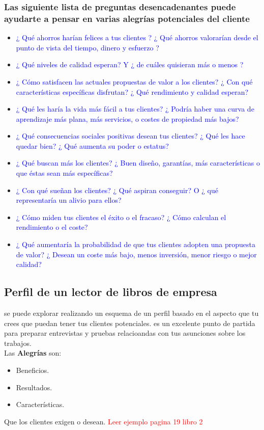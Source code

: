 \documentclass[11pt]{book}
\begin{document}
\subsubsection{Las siguiente lista de preguntas desencadenantes puede ayudarte a pensar en varias alegrías potenciales del cliente}
\begin{itemize}
\item \textcolor{blue}{ ¿ Qué ahorros harían felices a tus clientes ? ¿ Qué ahorros valorarían
desde el punto de vista del tiempo, dinero y esfuerzo ? }
\item \textcolor{blue}{ ¿ Qué niveles de calidad esperan? Y ¿ de cuáles quisieran más o menos ?}
\item \textcolor{blue}{ ¿ Cómo satisfacen las actuales propuestas de valor a los clientes? ¿ Con qué
características específicas disfrutan? ¿ Qué rendimiento y calidad esperan? }
\item \textcolor{blue}{ ¿ Qué les haría la vida más fácil a tus clientes? ¿ Podría haber una curva de
aprendizaje más plana, más servicios, o costes de propiedad más bajos?
 }
\item \textcolor{blue}{ ¿ Qué consecuencias sociales positivas desean tus clientes? ¿ Qué les hace
quedar bien? ¿ Qué aumenta su poder o estatus? }
\item \textcolor{blue}{ ¿ Qué buscan más los clientes? ¿ Buen diseño, garantías, más
características o que éstas sean más específicas?
 }
\item \textcolor{blue}{ ¿ Con qué sueñan los clientes? ¿ Qué aspiran conseguir? O ¿ qué
representaría un alivio para ellos? }
\item \textcolor{blue}{ ¿ Cómo miden tus clientes el éxito o el fracaso? ¿ Cómo calculan el
rendimiento o el coste? }
\item \textcolor{blue}{ ¿ Qué aumentaría la probabilidad de que tus clientes adopten
una propuesta de valor? ¿ Desean un coste más bajo, menos
inversión, menor riesgo o mejor calidad? }
\end{itemize}
\subsection{Perfil de un lector de libros de empresa}
se puede explorar realizando un esquema de un perfil basado en el aspecto que tu crees que puedan tener tus clientes potenciales. es un excelente punto de partida para preparar entrevistas y pruebas relacioandas con tus asunciones sobre los trabajos.\\
Las \textbf{Alegrías} son:
\begin{itemize}
\item Beneficios.
\item Resultados.
\item Características.
\end{itemize}
Que los clientes exigen o desean.
\textcolor{red}{Leer ejemplo pagina 19 libro 2}
\end{document}
